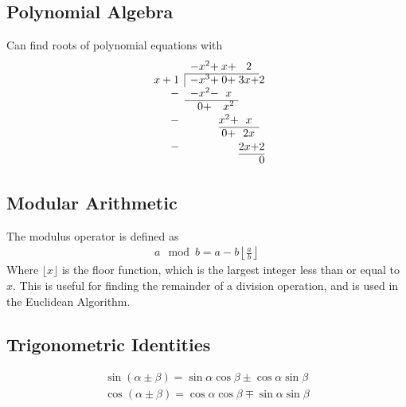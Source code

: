 \subsection{Polynomial Algebra}

Can find roots of polynomial equations with
$$
\begin{array}{rc@{}c@{}c@{}c@{}}
& -x^2 +& x + &2 & \\ \cline{2-4}
\multicolumn{1}{r|}{x+1} &-x^3+ & 0 + & 3x +&2\\
-&-x^2 -&x  &\\ \cline{2-3}
& 0 +& x^2 &\\ 
-&  & x^2 +&x\\ \cline{3-4}
& & 0 +&2x &\\ 
-& &  &2x +&2\\ \cline{4-5}
& & & &0\\
\end{array}
$$

\subsection{Modular Arithmetic}

The modulus operator is defined as
\begin{align}
a \mod b = a - b\left\lfloor\frac{a}{b}\right\rfloor
\end{align}
Where $\lfloor x \rfloor$ is the floor function, which is the largest integer less than or equal to $x$. This is useful for finding the remainder of a division operation, and is used in the Euclidean Algorithm.

\subsection{Trigonometric Identities}

\begin{align}
\sin(\alpha\pm\beta) = \sin\alpha\cos\beta\pm\cos\alpha\sin\beta\\
\cos(\alpha\pm\beta) = \cos\alpha\cos\beta\mp\sin\alpha\sin\beta
\end{align}


